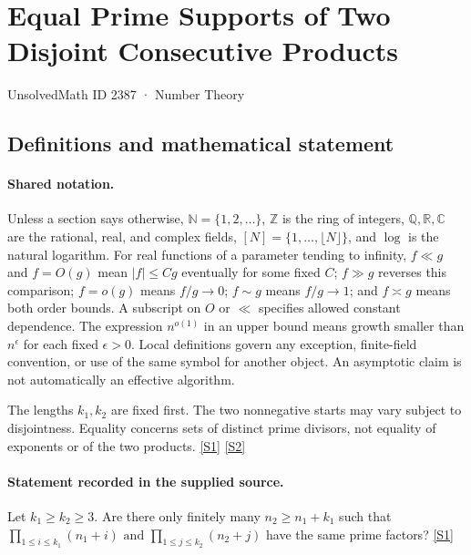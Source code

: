 \documentclass[11pt,a4paper]{article}
\newcommand{\N}{\mathbb{N}}
\newcommand{\Z}{\mathbb{Z}}
\newcommand{\Q}{\mathbb{Q}}
\newcommand{\R}{\mathbb{R}}
\newcommand{\C}{\mathbb{C}}
\newcommand{\sref}[2]{\hyperlink{source:#1:#2}{[S#2]}}
\begin{document}

\setcounter{section}{2386}

\section{Equal Prime Supports of Two Disjoint Consecutive Products}\label{2387}

{\small\sffamily UnsolvedMath ID 2387 · Number Theory}

\subsection{Definitions and mathematical statement}

\paragraph{Shared notation.}Unless a section says otherwise, $\N=\{1,2,\ldots\}$,
$\Z$ is the ring of integers, $\Q,\R,\C$ are the rational, real, and complex
fields, $[N]=\{1,\ldots,\lfloor N\rfloor\}$, and $\log$ is the natural
logarithm. For real functions of a parameter tending to infinity,
$f\ll g$ and $f=O(g)$ mean $|f|\leq Cg$ eventually for some fixed $C$;
$f\gg g$ reverses this comparison; $f=o(g)$ means $f/g\to0$;
$f\sim g$ means $f/g\to1$; and $f\asymp g$ means both order bounds.
A subscript on $O$ or $\ll$ specifies allowed constant dependence.
The expression $n^{o(1)}$ in an upper bound means growth smaller than
$n^\epsilon$ for each fixed $\epsilon>0$. Local definitions govern any
exception, finite-field convention, or use of the same symbol for another
object. An asymptotic claim is not automatically an effective algorithm.



The lengths $k_1,k_2$ are fixed first. The two nonnegative starts may vary subject to disjointness. Equality concerns sets of distinct prime divisors, not equality of exponents or of the two products. \sref{2387}{1} \sref{2387}{2}

\paragraph{Statement recorded in the supplied source.}
Let $k_1\geq k_2\geq 3$. Are there only finitely many $n_2\geq n_1+k_1$ such that $ \prod_{1\leq i\leq k_1}(n_1+i)\textrm{ and }\prod_{1\leq j\leq k_2}(n_2+j) $ have the same prime factors? \sref{2387}{1}
\end{document}
